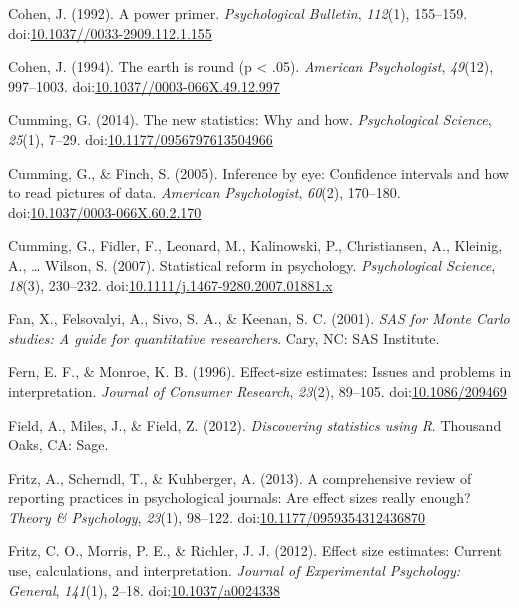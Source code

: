\documentclass[english,man]{apa6}
\theoremstyle{definition}
\theoremstyle{definition}
\theoremstyle{definition}
\theoremstyle{remark}
\begin{document}
\hypertarget{ref-Cohen1992a}{}
Cohen, J. (1992). A power primer. \emph{Psychological Bulletin},
\emph{112}(1), 155--159.
doi:\href{https://doi.org/10.1037//0033-2909.112.1.155}{10.1037//0033-2909.112.1.155}

\hypertarget{ref-CohenJ1994}{}
Cohen, J. (1994). The earth is round (p \textless{} .05). \emph{American
Psychologist}, \emph{49}(12), 997--1003.
doi:\href{https://doi.org/10.1037//0003-066X.49.12.997}{10.1037//0003-066X.49.12.997}

\hypertarget{ref-Cumming2014}{}
Cumming, G. (2014). The new statistics: Why and how. \emph{Psychological
Science}, \emph{25}(1), 7--29.
doi:\href{https://doi.org/10.1177/0956797613504966}{10.1177/0956797613504966}

\hypertarget{ref-Cumming2005}{}
Cumming, G., \& Finch, S. (2005). Inference by eye: Confidence intervals
and how to read pictures of data. \emph{American Psychologist},
\emph{60}(2), 170--180.
doi:\href{https://doi.org/10.1037/0003-066X.60.2.170}{10.1037/0003-066X.60.2.170}

\hypertarget{ref-Cumming2007}{}
Cumming, G., Fidler, F., Leonard, M., Kalinowski, P., Christiansen, A.,
Kleinig, A., \ldots{} Wilson, S. (2007). Statistical reform in
psychology. \emph{Psychological Science}, \emph{18}(3), 230--232.
doi:\href{https://doi.org/10.1111/j.1467-9280.2007.01881.x}{10.1111/j.1467-9280.2007.01881.x}

\hypertarget{ref-Fan2001}{}
Fan, X., Felsovalyi, A., Sivo, S. A., \& Keenan, S. C. (2001). \emph{SAS
for Monte Carlo studies: A guide for quantitative researchers}. Cary,
NC: SAS Institute.

\hypertarget{ref-Fern1996}{}
Fern, E. F., \& Monroe, K. B. (1996). Effect-size estimates: Issues and
problems in interpretation. \emph{Journal of Consumer Research},
\emph{23}(2), 89--105.
doi:\href{https://doi.org/10.1086/209469}{10.1086/209469}

\hypertarget{ref-Field2012}{}
Field, A., Miles, J., \& Field, Z. (2012). \emph{Discovering statistics
using R}. Thousand Oaks, CA: Sage.

\hypertarget{ref-Fritz2013}{}
Fritz, A., Scherndl, T., \& Kuhberger, A. (2013). A comprehensive review
of reporting practices in psychological journals: Are effect sizes
really enough? \emph{Theory \& Psychology}, \emph{23}(1), 98--122.
doi:\href{https://doi.org/10.1177/0959354312436870}{10.1177/0959354312436870}

\hypertarget{ref-Fritz2012}{}
Fritz, C. O., Morris, P. E., \& Richler, J. J. (2012). Effect size
estimates: Current use, calculations, and interpretation. \emph{Journal
of Experimental Psychology: General}, \emph{141}(1), 2--18.
doi:\href{https://doi.org/10.1037/a0024338}{10.1037/a0024338}
\end{document}
